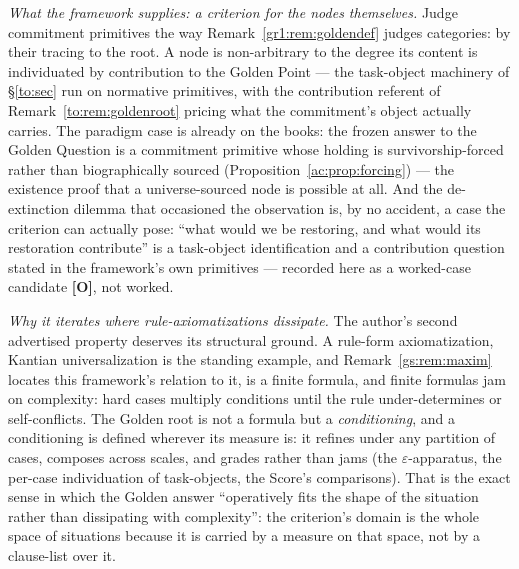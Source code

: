 \documentclass[11pt]{article}
\numberwithin{equation}{section}
\theoremstyle{plain}
\theoremstyle{definition}
\theoremstyle{remark}
\begin{document}
\emph{What the framework supplies: a criterion for the nodes
themselves.} Judge commitment primitives the way
Remark~\ref{gr1:rem:goldendef} judges categories: by their tracing to
the root. A node is non-arbitrary to the degree its content is
individuated by contribution to the Golden Point --- the task-object
machinery of \S\ref{to:sec} run on normative primitives, with the
contribution referent of Remark~\ref{to:rem:goldenroot} pricing what
the commitment's object actually carries. The paradigm case is
already on the books: the frozen answer to the Golden Question is a
commitment primitive whose holding is survivorship-forced rather than
biographically sourced (Proposition~\ref{ac:prop:forcing}) --- the
existence proof that a universe-sourced node is possible at all. And
the de-extinction dilemma that occasioned the observation is, by no
accident, a case the criterion can actually pose: ``what would we be
restoring, and what would its restoration contribute'' is a
task-object identification and a contribution question stated in the
framework's own primitives --- recorded here as a worked-case
candidate \textbf{[O]}, not worked.

\emph{Why it iterates where rule-axiomatizations dissipate.} The
author's second advertised property deserves its structural ground. A
rule-form axiomatization, Kantian universalization is the standing
example, and Remark~\ref{gs:rem:maxim} locates this framework's
relation to it, is a finite formula, and finite formulas jam on
complexity: hard cases multiply conditions until the rule
under-determines or self-conflicts. The Golden root is not a formula
but a \emph{conditioning}, and a conditioning is defined wherever its
measure is: it refines under any partition of cases, composes across
scales, and grades rather than jams (the $\varepsilon$-apparatus, the
per-case individuation of task-objects, the Score's comparisons). That
is the exact sense in which the Golden answer ``operatively fits the
shape of the situation rather than dissipating with complexity'': the
criterion's domain is the whole space of situations because it is
carried by a measure on that space, not by a clause-list over it.
\end{document}
